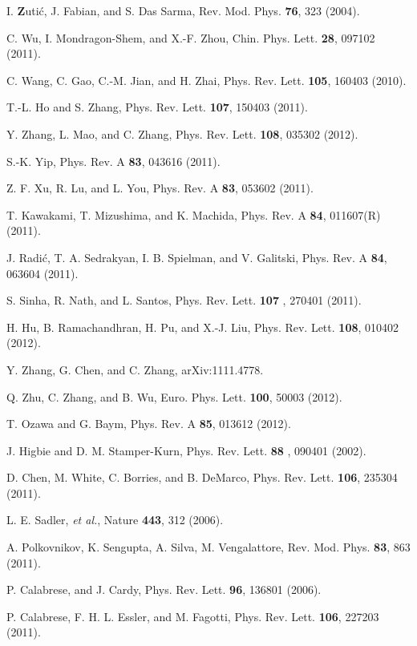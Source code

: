 \documentclass[prl,aps,twocolumn,showpacs,floatfix]{revtex4-1}
\renewcommand{\v}[1]{{\bf #1}}
\begin{document}
\begin{thebibliography}{99}
 I. \v{Z}uti\'{c}, J. Fabian, and S. Das Sarma, Rev. Mod.
Phys. \textbf{76}, 323 (2004).

 C. Wu, I. Mondragon-Shem, and X.-F. Zhou, Chin. Phys. Lett.
\textbf{28}, 097102 (2011).

 C. Wang, C. Gao, C.-M. Jian, and H. Zhai, Phys. Rev. Lett.
\textbf{105}, 160403 (2010).

 T.-L. Ho and S. Zhang, Phys. Rev. Lett. \textbf{107}, 150403
(2011).

 Y. Zhang, L. Mao, and C. Zhang, Phys. Rev. Lett. \textbf{108},
035302 (2012).

 S.-K. Yip, Phys. Rev. A \textbf{83}, 043616 (2011).

 Z. F. Xu, R. Lu, and L. You, Phys. Rev. A \textbf{83}, 053602
(2011).

 T. Kawakami, T. Mizushima, and K. Machida, Phys. Rev. A
\textbf{84}, 011607(R) (2011).

 J. Radi\'{c}, T. A. Sedrakyan, I. B. Spielman, and V.
Galitski, Phys. Rev. A \textbf{84}, 063604 (2011).

 S. Sinha, R. Nath, and L. Santos, Phys. Rev. Lett. \textbf{107}%
, 270401 (2011).

 H. Hu, B. Ramachandhran, H. Pu, and X.-J. Liu, Phys. Rev.
Lett. \textbf{108}, 010402 (2012).

 Y. Zhang, G. Chen, and C. Zhang, arXiv:1111.4778.

 Q. Zhu, C. Zhang, and B. Wu, Euro. Phys. Lett. \textbf{100},
50003 (2012).

 T. Ozawa and G. Baym, Phys. Rev. A \textbf{85}, 013612 (2012).

 J. Higbie and D. M. Stamper-Kurn, Phys. Rev. Lett. \textbf{88}%
, 090401 (2002).

 D. Chen, M. White, C. Borries, and B. DeMarco, Phys. Rev.
Lett. \textbf{106}, 235304 (2011).

 L. E. Sadler, \textit{et al.}, Nature \textbf{443}, 312
(2006).

 A. Polkovnikov, K. Sengupta, A. Silva, M. Vengalattore,
Rev. Mod. Phys. \textbf{83}, 863 (2011).

 P. Calabrese, and J. Cardy, Phys. Rev. Lett. \textbf{96},
136801 (2006).

 P. Calabrese, F. H. L. Essler, and M. Fagotti, Phys. Rev.
Lett. \textbf{106}, 227203 (2011).


\end{thebibliography}
\end{document}
